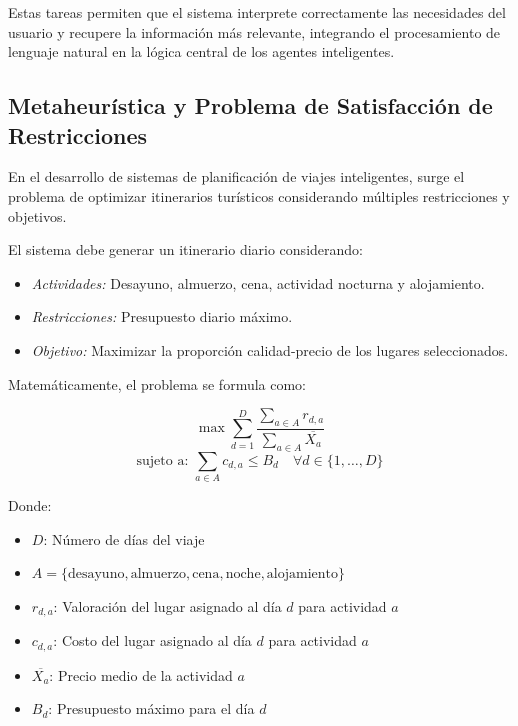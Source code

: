 \documentclass[10pt]{llncs}
\begin{document}
Estas tareas permiten que el sistema interprete correctamente las necesidades del usuario y recupere la información más relevante, integrando el procesamiento de lenguaje natural en la lógica central de los agentes inteligentes.

\vspace{\baselineskip}

\subsection{Metaheurística y Problema de Satisfacción de Restricciones \cite{Talbi2009}}



En el desarrollo de sistemas de planificación de viajes inteligentes, surge el problema de optimizar itinerarios turísticos considerando múltiples restricciones y objetivos.

El sistema debe generar un itinerario diario considerando:
\begin{itemize}
    \item \textit{Actividades:} Desayuno, almuerzo, cena, actividad nocturna y alojamiento.
    \item \textit{Restricciones:} Presupuesto diario máximo.
    \item \textit{Objetivo:} Maximizar la proporción calidad-precio de los lugares seleccionados.
\end{itemize}

Matemáticamente, el problema se formula como:

\[
\max \sum_{d=1}^{D} \dfrac{\sum_{a \in A} r_{d,a}}{\sum_{a \in A}\overline{X_a} }
\]
\[
\text{sujeto a: }
\sum_{a \in A} c_{d,a} \leq B_d \quad \forall d \in \{1,\dots,D\}
\]

Donde:
\begin{itemize}
    \item $D$: Número de días del viaje
    \item $A = \{\text{desayuno}, \text{almuerzo}, \text{cena}, \text{noche}, \text{alojamiento}\}$
    \item $r_{d,a}$: Valoración del lugar asignado al día $d$ para actividad $a$
    \item $c_{d,a}$: Costo del lugar asignado al día $d$ para actividad $a$
    \item $\overline{X_a}$: Precio medio de la actividad $a$
    \item $B_d$: Presupuesto máximo para el día $d$
\end{itemize}
\end{document}
